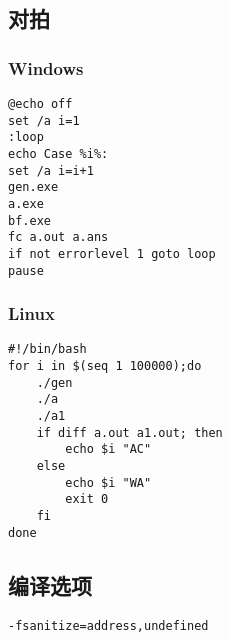 \documentclass[twocolumn,a4]{article}
\begin{document}
\subsection{对拍}
\subsubsection{Windows}
\begin{lstlisting}
@echo off
set /a i=1
:loop
echo Case %i%:
set /a i=i+1
gen.exe
a.exe
bf.exe
fc a.out a.ans
if not errorlevel 1 goto loop
pause
\end{lstlisting}
\subsubsection{Linux}
\begin{lstlisting}
#!/bin/bash
for i in $(seq 1 100000);do
    ./gen
    ./a
    ./a1
    if diff a.out a1.out; then
    	echo $i "AC"
    else
        echo $i "WA"
        exit 0
    fi
done
\end{lstlisting}
\subsection{编译选项}
\begin{lstlisting}
-fsanitize=address,undefined
\end{lstlisting}

\end{document}
